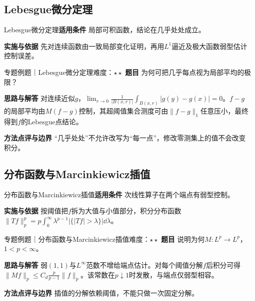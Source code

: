 \subsection{Lebesgue微分定理}\label{mat:fourier_advanced:differentiate}
\begin{method}{Lebesgue微分定理}\textbf{适用条件} 局部可积函数，结论在几乎处处成立。\par\textbf{实施与依据} 先对连续函数由一致局部变化证明，再用$L^1$逼近及极大函数弱型估计控制误差。\end{method}
\begin{example}{专题例题｜Lebesgue微分定理}{难度：$\star\star$}
\textbf{题目} 为何可把几乎每点视为局部平均的极限？\par\textbf{思路与解答} 对连续近似$g$，$\lim_{r\to0}\frac1{|B(x,r)|}\int_{B(x,r)}|g(y)-g(x)|=0$。$f-g$的局部平均由$M(f-g)$控制，其超阈值集合测度可由$\|f-g\|_1$任意压小，最终得到$f$的Lebesgue点结论。\par\textbf{方法点评与边界} “几乎处处”不允许改写为“每一点”，修改零测集上的值不会改变积分。
\end{example}
\subsection{分布函数与Marcinkiewicz插值}\label{mat:fourier_advanced:interpolation}
\begin{method}{分布函数与Marcinkiewicz插值}\textbf{适用条件} 次线性算子在两个端点有弱型控制。\par\textbf{实施与依据} 按阈值把$f$拆为大值与小值部分，积分分布函数$\|Tf\|_p^p=p\int_0^\infty\lambda^{p-1}|\{|Tf|>\lambda\}|\dd\lambda$。\end{method}
\begin{example}{专题例题｜分布函数与Marcinkiewicz插值}{难度：$\star\star$}
\textbf{题目} 说明为何$M:L^p\to L^p$，$1<p<\infty$。\par\textbf{思路与解答} 弱$(1,1)$与$L^\infty$范数不增给端点估计。对每个阈值分解$f$后积分可得$\|Mf\|_p\le C_d\frac p{p-1}\|f\|_p$。该常数在$p\downarrow1$时发散，与端点仅弱型相容。\par\textbf{方法点评与边界} 插值的分解依赖阈值，不能只做一次固定分解。
\end{example}
